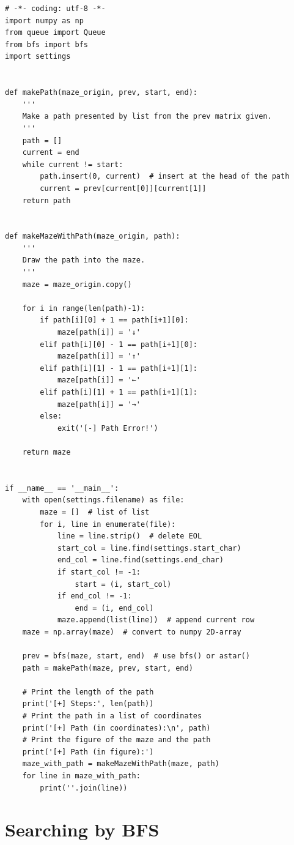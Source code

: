 \documentclass[a4paper, 11pt]{article}
\begin{document}
\begin{lstlisting}[title=main.py]
# -*- coding: utf-8 -*-
import numpy as np
from queue import Queue
from bfs import bfs
import settings


def makePath(maze_origin, prev, start, end):
    '''
    Make a path presented by list from the prev matrix given.
    '''
    path = []
    current = end
    while current != start:
        path.insert(0, current)  # insert at the head of the path
        current = prev[current[0]][current[1]]
    return path


def makeMazeWithPath(maze_origin, path):
    '''
    Draw the path into the maze.
    '''
    maze = maze_origin.copy()

    for i in range(len(path)-1):
        if path[i][0] + 1 == path[i+1][0]:
            maze[path[i]] = '↓'
        elif path[i][0] - 1 == path[i+1][0]:
            maze[path[i]] = '↑'
        elif path[i][1] - 1 == path[i+1][1]:
            maze[path[i]] = '←'
        elif path[i][1] + 1 == path[i+1][1]:
            maze[path[i]] = '→'
        else:
            exit('[-] Path Error!')

    return maze


if __name__ == '__main__':
    with open(settings.filename) as file:
        maze = []  # list of list
        for i, line in enumerate(file):
            line = line.strip()  # delete EOL
            start_col = line.find(settings.start_char)
            end_col = line.find(settings.end_char)
            if start_col != -1:
                start = (i, start_col)
            if end_col != -1:
                end = (i, end_col)
            maze.append(list(line))  # append current row
    maze = np.array(maze)  # convert to numpy 2D-array

    prev = bfs(maze, start, end)  # use bfs() or astar()
    path = makePath(maze, prev, start, end)

    # Print the length of the path
    print('[+] Steps:', len(path))
    # Print the path in a list of coordinates
    print('[+] Path (in coordinates):\n', path)
    # Print the figure of the maze and the path
    print('[+] Path (in figure):')
    maze_with_path = makeMazeWithPath(maze, path)
    for line in maze_with_path:
        print(''.join(line))
\end{lstlisting}

\section{Searching by BFS}
\end{document}
